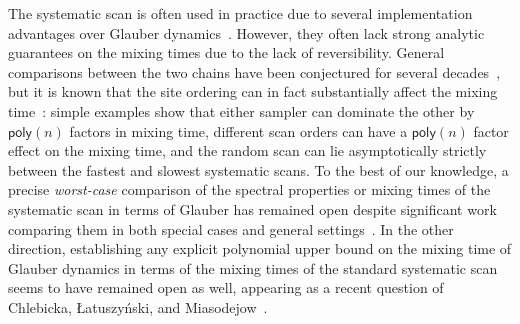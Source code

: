\documentclass[11pt]{article}
\begin{document}
The systematic scan is often used in practice due to several implementation advantages over Glauber dynamics~\cite{DBLP:conf/approx/DyerGJ06,DBLP:conf/sigmod/ZhangR13}. However, they often lack strong analytic guarantees on the mixing times due to the lack of reversibility. General comparisons between the two chains have been conjectured for several decades~\cite{diaconis,levin2017markov}, but it is known that the site ordering can in fact substantially affect the mixing time~\cite{roberts2015surprising,DBLP:conf/nips/HeSMR16}: simple examples show that either sampler can dominate the other by $\mathsf{poly}(n)$ factors in mixing time, different scan orders can have a $\mathsf{poly}(n)$ factor effect on the mixing time, and the random scan can lie asymptotically strictly between the fastest and slowest systematic scans. To the best of our knowledge, a precise \emph{worst-case} comparison of the spectral properties or mixing times of the systematic scan in terms of Glauber has remained open despite significant work comparing them in both special cases and general settings~\cite{amit,dyer_colors,diaconis_ram,DBLP:conf/approx/BlancaZ23,simon,DBLP:conf/approx/DyerGJ06,fishman,DBLP:conf/nips/HeSMR16,chlebicka}. In the other direction, establishing any explicit polynomial upper bound on the mixing time of Glauber dynamics in terms of the mixing times of the standard systematic scan seems to have remained open as well, appearing as a recent question of Chlebicka,  Łatuszy\'nski, and Miasodejow~\cite{chlebicka}.
\end{document}
